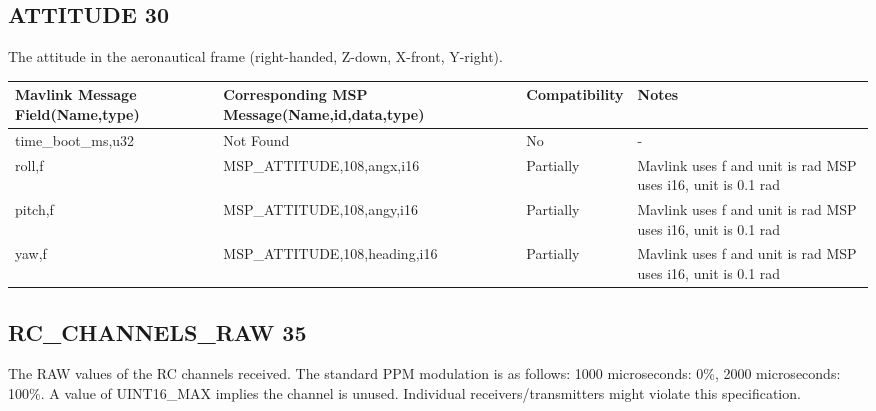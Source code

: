 
\subsection{ATTITUDE 30} 
The attitude in the aeronautical frame (right-handed, Z-down, X-front, Y-right).\\

{
\centering
\begin{tabular}{ |p{4cm  } |p{7cm} | p{2cm}|m{5em}|}
\hline
Mavlink Message Field(Name,type)&Corresponding MSP Message(Name,id,data,type)& Compatibility & Notes\\
\hline
time\_boot\_ms,u32 & Not Found & No & - \\
\hline
\rowcolor{lightgray}
roll,f & MSP\_ATTITUDE,108,angx,i16& Partially & Mavlink uses f and unit is rad MSP uses i16, unit is 0.1 rad  \\
\hline
\rowcolor{lightgray}
pitch,f & MSP\_ATTITUDE,108,angy,i16& Partially & Mavlink uses f and unit is rad MSP uses i16, unit is 0.1 rad  \\
\hline
\rowcolor{lightgray}
yaw,f & MSP\_ATTITUDE,108,heading,i16& Partially & Mavlink uses f and unit is rad MSP uses i16, unit is 0.1 rad  \\



\end{tabular}
}

\cleardoublepage



\subsection{RC\_CHANNELS\_RAW 35} 
The RAW values of the RC channels received. The standard PPM modulation is as follows: 1000 microseconds: 0\%, 2000 microseconds: 100\%. A value of UINT16\_MAX implies the channel is unused. Individual receivers/transmitters might violate this specification.\\

